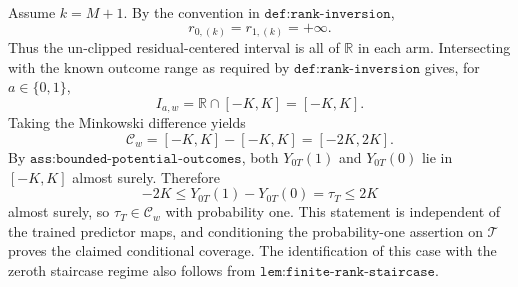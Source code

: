 Assume \(k=M+1\). By the convention in \(\texttt{def:rank-inversion}\),
\[
r_{0,(k)}=r_{1,(k)}=+\infty.
\]
Thus the un-clipped residual-centered interval is all of \(\mathbb R\) in each arm. Intersecting with the known outcome range as required by \(\texttt{def:rank-inversion}\) gives, for \(a\in\{0,1\}\),
\[
I_{a,w}=\mathbb R\cap[-K,K]=[-K,K].
\]
Taking the Minkowski difference yields
\[
\mathcal C_w=[-K,K]-[-K,K]=[-2K,2K].
\]
By \(\texttt{ass:bounded-potential-outcomes}\), both \(Y_{0T}(1)\) and \(Y_{0T}(0)\) lie in \([-K,K]\) almost surely. Therefore
\[
-2K\le Y_{0T}(1)-Y_{0T}(0)=\tau_T\le2K
\]
almost surely, so \(\tau_T\in\mathcal C_w\) with probability one. This statement is independent of the trained predictor maps, and conditioning the probability-one assertion on \(\mathcal T\) proves the claimed conditional coverage. The identification of this case with the zeroth staircase regime also follows from \(\texttt{lem:finite-rank-staircase}\).